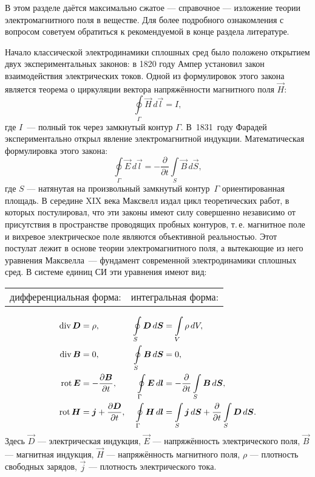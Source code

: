 \newcommand*{\ddt}[1]{\frac{\partial #1}{\partial t}}

В этом разделе даётся максимально сжатое --- справочное --- изложение теории электромагнитного
поля в веществе. Для более подробного ознакомления с вопросом 
советуем обратиться к рекомендуемой в конце раздела литературе.


Начало классической электродинамики сплошных сред было положено открытием двух
экспериментальных законов: в 1820 году Ампер установил закон взаимодействия 
электрических токов. Одной из формулировок этого закона является теорема 
о циркуляции вектора напряжённости магнитного поля $\vec{H}$:
\[
\oint\limits_{\Gamma}\vec{H}\,d\vec{l}=I,
\]
где $I$~--- полный ток через замкнутый контур $\Gamma$. В~1831~году Фарадей 
экспериментально открыл явление электромагнитной индукции. Математическая формулировка
этого закона:
\[
\oint\limits_{\Gamma}\vec{E}\,d\vec{l}=- \frac{\partial}{\partial t} \int\limits_S \vec{B}\, d\vec{S},
\]
где $S$ --- натянутая на произвольный замкнутый контур~$\Gamma$ ориентированная площадь.
В середине XIX века Максвелл издал цикл теоретических работ, в которых постулировал, что эти законы имеют силу совершенно независимо 
от присутствия в пространстве проводящих пробных контуров, т.\,е. магнитное поле 
и вихревое электрическое поле являются объективной реальностью. 
Этот постулат лежит в основе теории электромагнитного поля, а вытекающие 
из него уравнения Максвелла~--- фундамент современной электродинамики сплошных сред. 
В системе единиц СИ эти уравнения имеют вид:
\begin{tabular}{p{4.3cm}p{5cm}}
\small дифференциальная форма: & \small интегральная форма:
\end{tabular}
\begin{align}
\Div \vec{D} &= \rho,         & 
    \oint\limits_S \vec{D}\,d\vec{S} &= \int\limits_V\rho\, dV, \eqmark{1} \\
\Div \vec{B} &= 0,            & 
    \oint\limits_S \vec{B}\,d\vec{S} &= 0, \eqmark{2} \\
\Rot \vec{E} &= -\ddt{\vec{B}}, & 
    \oint\limits_{\Gamma} \vec{E}\,d\vec{l} & = 
           - \frac{\partial}{\partial t} \int\limits_S \vec{B}\, d\vec{S}, \eqmark{3}\\
\Rot \vec{H} &= \vec{j} + \ddt{\vec{D}}, & 
    \oint\limits_{\Gamma} \vec{H}\,d\vec{l} &= \int\limits_S \vec{j}\,d\vec{S} + 
                  \frac{\partial}{\partial t} \int\limits_S \vec{D}\, d\vec{S}. \eqmark{4}
\end{align}
Здесь $\vec{D}$ --- электрическая индукция, 
$\vec{E}$ --- напряжённость электрического поля, 
$\vec{B}$ --- магнитная индукция, $\vec{H}$ --- напряжённость магнитного поля,
$\rho$ --- плотность свободных зарядов, $\vec{j}$ --- плотность электрического тока.

